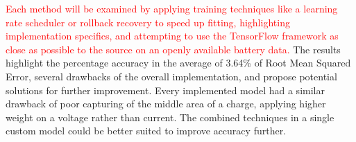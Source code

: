 {\textcolor{red}{Each method will be examined by applying training techniques like a learning rate scheduler or rollback recovery to speed up fitting, highlighting implementation specifics, and attempting to use the TensorFlow framework as close as possible to the source on an openly available battery data.}
The results highlight the percentage accuracy in the average of 3.64\% of Root Mean Squared Error, several drawbacks of the overall implementation, and propose potential solutions for further improvement.
Every implemented model had a similar drawback of poor capturing of the middle area of a charge, applying higher weight on a voltage rather than current.
The combined techniques in a single custom model could be better suited to improve accuracy further.
}